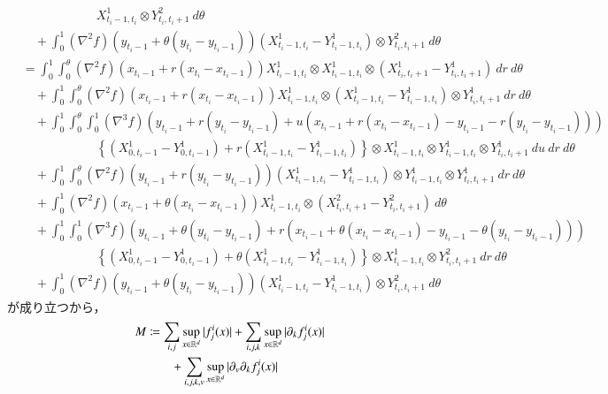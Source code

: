 \begin{prf}
\begin{description}
\begin{align}
						&\qquad\qquad\qquad X^1_{t_i-1,t_i} \otimes Y^2_{t_i,t_i+1}\ d\theta \\
						&\quad + \int_0^1 (\nabla^2 f)(y_{t_i-1}+\theta(y_{t_i}-y_{t_i-1})) \left( X^1_{t_i-1,t_i} - Y^1_{t_i-1,t_i} \right) \otimes Y^2_{t_i,t_i+1}\ d\theta \\
					&= \int_0^1 \int_0^\theta (\nabla^2 f)(x_{t_i-1}+r(x_{t_i}-x_{t_i-1})) X^1_{t_i-1,t_i} \otimes X^1_{t_i-1,t_i} \otimes \left(X^1_{t_i,t_i+1} - Y^1_{t_i,t_i+1}\right)\ dr\ d\theta \\
						&\quad + \int_0^1 \int_0^\theta (\nabla^2 f)(x_{t_i-1}+r(x_{t_i}-x_{t_i-1})) X^1_{t_i-1,t_i} \otimes \left(X^1_{t_i-1,t_i} - Y^1_{t_i-1,t_i} \right) \otimes Y^1_{t_i,t_i+1}\ dr\ d\theta \\
						&\quad +  \int_0^1 \int_0^\theta \int_0^1 (\nabla^3 f)(y_{t_i-1}+r(y_{t_i}-y_{t_i-1}) + u(x_{t_i-1}+r(x_{t_i}-x_{t_i-1}) - y_{t_i-1}-r(y_{t_i}-y_{t_i-1}))) \\
						&\qquad\qquad\qquad \left\{ \left( X^1_{0,t_i-1} - Y^1_{0,t_i-1} \right) + r\left( X^1_{t_i-1,t_i} - Y^1_{t_i-1,t_i} \right) \right\} \otimes X^1_{t_i-1,t_i} \otimes Y^1_{t_i-1,t_i} \otimes Y^1_{t_i,t_i+1}\ du\ dr\ d\theta \\
						&\quad + \int_0^1 \int_0^\theta (\nabla^2 f)(y_{t_i-1}+r(y_{t_i}-y_{t_i-1})) \left( X^1_{t_i-1,t_i} - Y^1_{t_i-1,t_i} \right) \otimes Y^1_{t_i-1,t_i} \otimes Y^1_{t_i,t_i+1}\ dr\ d\theta \\
						&\quad + \int_0^1 (\nabla^2 f)(x_{t_i-1}+\theta(x_{t_i}-x_{t_i-1}))X^1_{t_i-1,t_i} \otimes \left(X^2_{t_i,t_i+1} -  Y^2_{t_i,t_i+1}\right)\ d\theta \\
						&\quad + \int_0^1 \int_0^1 (\nabla^3 f) (y_{t_i-1}+\theta(y_{t_i}-y_{t_i-1}) + r(x_{t_i-1}+\theta(x_{t_i}-x_{t_i-1})-y_{t_i-1}-\theta(y_{t_i}-y_{t_i-1}))) \\
						&\qquad\qquad\qquad \left\{ \left( X^1_{0,t_i-1} - Y^1_{0,t_i-1} \right) + \theta\left( X^1_{t_i-1,t_i} - Y^1_{t_i-1,t_i} \right) \right\} \otimes X^1_{t_i-1,t_i} \otimes Y^2_{t_i,t_i+1}\ dr\ d\theta \\
						&\quad + \int_0^1 (\nabla^2 f)(y_{t_i-1}+\theta(y_{t_i}-y_{t_i-1})) \left( X^1_{t_i-1,t_i} - Y^1_{t_i-1,t_i} \right) \otimes Y^2_{t_i,t_i+1}\ d\theta
				\end{align}
				が成り立つから，
				\begin{align}
					M &\coloneqq \sum_{i,j} \sup{x \in \R^d}{|f^i_j(x)|} + \sum_{i,j,k} \sup{x \in \R^d}{|\partial_k f^i_j(x)|} \\
						&\qquad + \sum_{i,j,k,v} \sup{x \in \R^d}{|\partial_v \partial_k f^i_j(x)|}

\end{align}
\end{description}
\end{prf}
